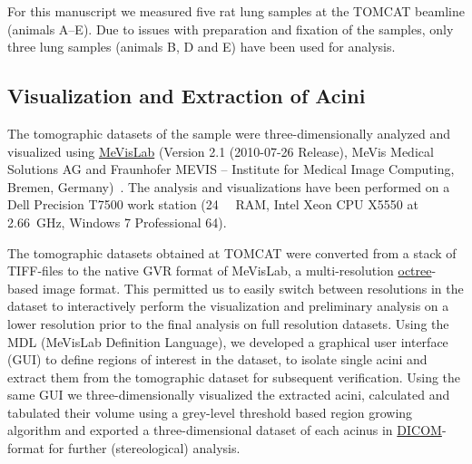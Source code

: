 \documentclass[a4paper,DIVcalc,abstract,english]{scrartcl}
\begin{document}
For this manuscript we measured five rat lung samples at the TOMCAT beamline (animals A--E).
Due to issues with preparation and fixation of the samples, only three lung samples (animals B, D and E) have been used for analysis.

\subsection{Visualization and Extraction of Acini}
The tomographic datasets of the sample were three-dimensionally analyzed and visualized using \href{http://mevislab.de}{MeVisLab} (Version 2.1 (2010-07-26 Release), MeVis Medical Solutions AG and Fraunhofer MEVIS -- Institute for Medical Image Computing, Bremen, Germany)~\cite{Bitter2007}.
The analysis and visualizations have been performed on a Dell Precision T7500 work station (\SI{24}{\giga\byte} RAM, Intel Xeon CPU X5550 at \SI{2.66}{\giga\hertz}, Windows 7 Professional \SI{64}{\bit}).

The tomographic datasets obtained at TOMCAT were converted from a stack of TIFF-files to the native GVR format of MeVisLab, a multi-resolution \href{https://secure.wikimedia.org/wikipedia/en/w/index.php?title=Octree&oldid=409131920}{octree}-based image format.
This permitted us to easily switch between resolutions in the dataset to interactively perform the visualization and preliminary analysis on a lower resolution prior to the final analysis on full resolution datasets.
Using the MDL (MeVisLab Definition Language), we developed a graphical user interface (GUI) to define regions of interest in the dataset, to isolate single acini and extract them from the tomographic dataset for subsequent verification.
Using the same GUI we three-dimensionally visualized the extracted acini, calculated and tabulated their volume using a grey-level threshold based region growing algorithm and exported a three-dimensional dataset of each acinus in \href{http://en.wikipedia.org/w/index.php?title=DICOM&oldid=511155074}{DICOM}-format for further (stereological) analysis.
\end{document}
